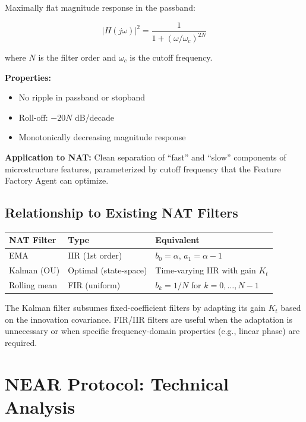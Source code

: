 \documentclass[11pt,a4paper]{article}
\begin{document}
Maximally flat magnitude response in the passband:

\begin{equation}
|H(j\omega)|^2 = \frac{1}{1 + \left(\omega / \omega_c\right)^{2N}}
\end{equation}

where $N$ is the filter order and $\omega_c$ is the cutoff frequency.

\textbf{Properties:}
\begin{itemize}
    \item No ripple in passband or stopband
    \item Roll-off: $-20N$ dB/decade
    \item Monotonically decreasing magnitude response
\end{itemize}

\textbf{Application to NAT:} Clean separation of ``fast'' and ``slow'' components of microstructure features, parameterized by cutoff frequency that the Feature Factory Agent can optimize.

\subsection{Relationship to Existing NAT Filters}

\begin{center}
\begin{tabular}{l l l}
\hline
\textbf{NAT Filter} & \textbf{Type} & \textbf{Equivalent} \\
\hline
EMA & IIR (1st order) & $b_0 = \alpha$, $a_1 = \alpha - 1$ \\
Kalman (OU) & Optimal (state-space) & Time-varying IIR with gain $K_t$ \\
Rolling mean & FIR (uniform) & $b_k = 1/N$ for $k = 0, \ldots, N-1$ \\
\hline
\end{tabular}
\end{center}

The Kalman filter subsumes fixed-coefficient filters by adapting its gain $K_t$ based on the innovation covariance. FIR/IIR filters are useful when the adaptation is unnecessary or when specific frequency-domain properties (e.g., linear phase) are required.

\newpage
\section{NEAR Protocol: Technical Analysis}
\end{document}
